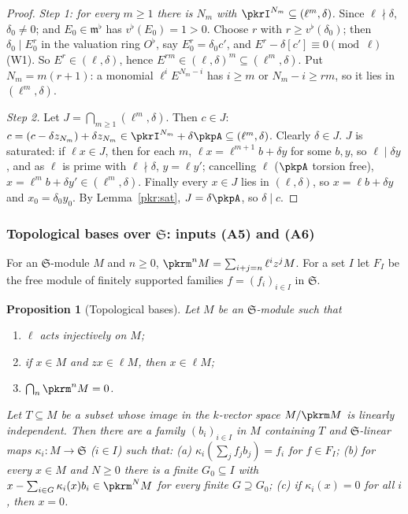 \documentclass[10pt]{amsart}
\newtheorem{proposition}[theorem]{Proposition}
\theoremstyle{definition}
\theoremstyle{remark}
\begin{document}
\begin{proof}
\emph{Step 1: for every $m\ge1$ there is $N_m$ with $\pkrI^{N_m}\subseteq(\ell^m,\delta)$.} Since
$\ell\nmid\delta$, $\delta_0\ne0$; and $E_0\in\mathfrak m^\flat$ has $v^\flat(E_0)=1>0$. Choose $r$ with
$r\ge v^\flat(\delta_0)$; then $\delta_0\mid E_0^r$ in the valuation ring $O^\flat$, say $E_0^r=\delta_0c'$,
and $E^r-\delta[c']\equiv0\pmod\ell$ (W1). So $E^r\in(\ell,\delta)$, hence $E^{rm}\in(\ell,\delta)^m\subseteq
(\ell^m,\delta)$. Put $N_m=m(r+1)$: a monomial $\ell^iE^{N_m-i}$ has $i\ge m$ or $N_m-i\ge rm$, so it lies
in $(\ell^m,\delta)$.

\emph{Step 2.} Let $J=\bigcap_{m\ge1}(\ell^m,\delta)$. Then $c\in J$: $c=(c-\delta z_{N_m})+\delta z_{N_m}
\in\pkrI^{N_m}+\delta\pkpA\subseteq(\ell^m,\delta)$. Clearly $\delta\in J$. $J$ is saturated: if
$\ell x\in J$, then for each $m$, $\ell x=\ell^{m+1}b+\delta y$ for some $b,y$, so $\ell\mid\delta y$,
and as $\ell$ is prime with $\ell\nmid\delta$, $y=\ell y'$; cancelling $\ell$ ($\pkpA$ torsion free),
$x=\ell^mb+\delta y'\in(\ell^m,\delta)$. Finally every $x\in J$ lies in $(\ell,\delta)$, so
$x=\ell b+\delta y$ and $x_0=\delta_0y_0$. By Lemma~\ref{pkr:sat}, $J=\delta\pkpA$, so $\delta\mid c$.
\end{proof}

\subsubsection{Topological bases over $\mathfrak S$: inputs (A5) and (A6)}\label{pkr:ss-basis}

For an $\mathfrak S$-module $M$ and $n\ge0$, $\pkrm^nM=\sum_{i+j=n}\ell^iz^jM$. For a set $I$ let
$F_I$ be the free module of finitely supported families $f=(f_i)_{i\in I}$ in $\mathfrak S$.

\begin{proposition}[Topological bases]\label{pkr:basis}
Let $M$ be an $\mathfrak S$-module such that
\begin{enumerate}
\item[(M1)] $\ell$ acts injectively on $M$;
\item[(M2)] if $x\in M$ and $zx\in\ell M$, then $x\in\ell M$;
\item[(M3)] $\bigcap_n\pkrm^nM=0$.
\end{enumerate}
Let $T\subseteq M$ be a subset whose image in the $k$-vector space $M/\pkrm M$ is linearly independent.
Then there are a family $(b_i)_{i\in I}$ in $M$ containing $T$ and $\mathfrak S$-linear maps
$\kappa_i\colon M\to\mathfrak S$ ($i\in I$) such that: (a) $\kappa_i(\sum_jf_jb_j)=f_i$ for $f\in F_I$;
(b) for every $x\in M$ and $N\ge0$ there is a finite $G_0\subseteq I$ with $x-\sum_{i\in G}\kappa_i(x)b_i
\in\pkrm^NM$ for every finite $G\supseteq G_0$; (c) if $\kappa_i(x)=0$ for all $i$, then $x=0$.
\end{proposition}
\end{document}
